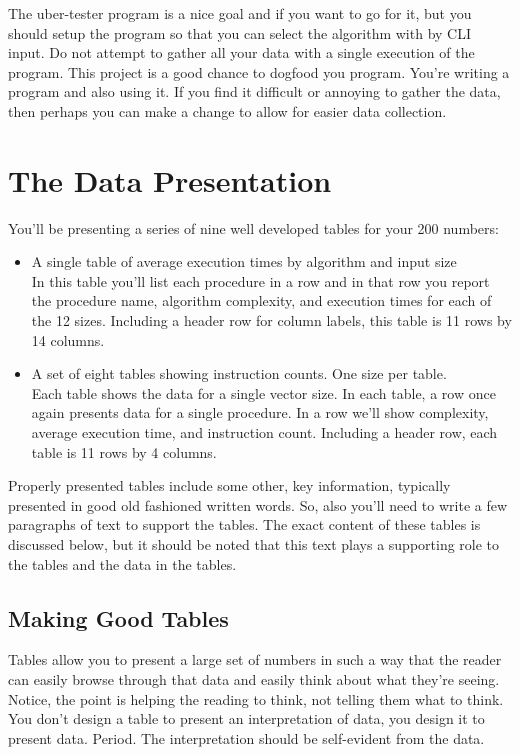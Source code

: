 \documentclass[]{tufte-handout}
\begin{document}
The uber-tester program is a nice goal and if you want to go for it, but you should setup the program so that you can select the algorithm with by CLI input. Do not attempt to gather all your data with a single execution of the program. This project is a good chance to dogfood you program. You're writing a program and also using it. If you find it difficult or annoying to gather the data, then perhaps you can make a change to allow for easier data collection.


\section{The Data Presentation}

You'll be presenting a series of nine well developed tables for your 200 numbers:
\begin{itemize}
\item A single table of average execution times by algorithm and input size \\
In this table you'll list each procedure in a row and in that row you report the procedure name, algorithm complexity, and execution times for each of the 12 sizes.  Including a header row for column labels, this table is 11 rows by 14 columns.
\item A set of eight tables showing instruction counts. One size per table. \\
Each table shows the data for a single vector size. In each table, a row once again presents data for a single procedure. In a row we'll show complexity, average execution time, and instruction count.  Including a header row, each table is 11 rows by 4 columns.
\end{itemize}
Properly presented tables include some other, key information, typically presented in good old fashioned written words. So, also you'll need to write a few paragraphs of text to support the tables. The exact content of these tables is discussed below, but it should be noted that this text plays a supporting role to the tables and the data in the tables.   


\subsection{Making Good Tables}

Tables allow you to present a large set of numbers in such a way that the reader can easily browse through that data and easily think about what they're seeing.  Notice, the point is helping the reading to think, not telling them what to think. You don't design a table to present an interpretation of data, you design it to present data. Period.  The interpretation should be self-evident from the data.
\end{document}
